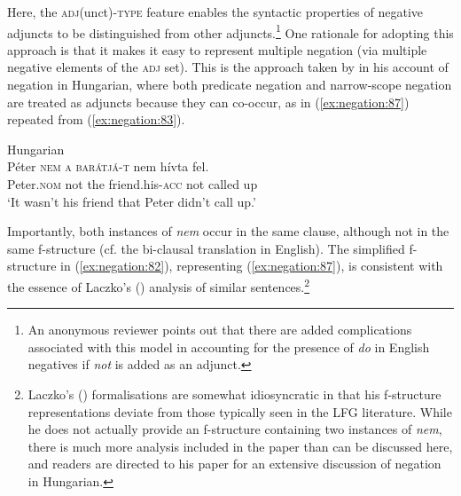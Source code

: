 \documentclass[output=paper,hidelinks]{langscibook}
\begin{document}
\ea \label{ex:negation:49} 
\z
Here, the \textsc{adj}(unct)-\textsc{type} feature enables the syntactic properties of negative adjuncts to be distinguished from other adjuncts.\footnote{An anonymous reviewer points out that there are added complications associated with this model in accounting for the presence of \emph{do} in English negatives if \emph{not} is added as an adjunct.} One rationale for adopting this approach is that it makes it easy to represent multiple negation (via multiple negative elements of the \textsc{adj} set). This is the approach taken by \citet {Laczko14} in his account of negation in Hungarian, where both predicate negation and narrow-scope negation are treated as adjuncts because they can co-occur, as in (\ref{ex:negation:87}) repeated from (\ref{ex:negation:83}).
 
 \ea Hungarian \citep [307] {Laczko14}\label{ex:negation:87}\\
 \gll Péter \textsc{nem} \textsc{a} \textsc{barátjá-t} nem hívta fel. \\
 Peter.\textsc{nom} not the friend.his-\textsc{acc} not called up \\
 \glt‘It wasn’t his friend that Peter didn’t call up.’
 \z
 
Importantly, both instances of \emph{nem} occur in the same clause, although not in the same f-structure (cf. the bi-clausal translation in English). The simplified f-structure in (\ref{ex:negation:82}), representing (\ref{ex:negation:87}), is consistent with the essence of Laczko's (\citeyear {Laczko14})  analysis of similar sentences.\footnote{Laczko's (\citeyear {Laczko14}) formalisations are somewhat idiosyncratic in that his f-structure representations deviate from those typically seen in the LFG literature. While he does not actually provide an f-structure containing two instances of \emph{nem}, there is much more analysis included in the paper than can be discussed here, and readers are directed to his paper for an extensive discussion of negation in Hungarian.}

\ea \label{ex:negation:82} 
\z
\end{document}
